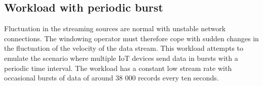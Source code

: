\subsection{Workload with periodic burst}
Fluctuation in the streaming sources are normal with unstable network connections. 
The windowing operator must therefore cope with sudden changes in the 
fluctuation of the velocity of the data stream. This workload attempts to emulate 
the scenario where multiple IoT devices send data in bursts with a periodic 
time interval. The workload has a constant low stream rate with occasional 
bursts of data of around 38 000 records every ten seconds.







